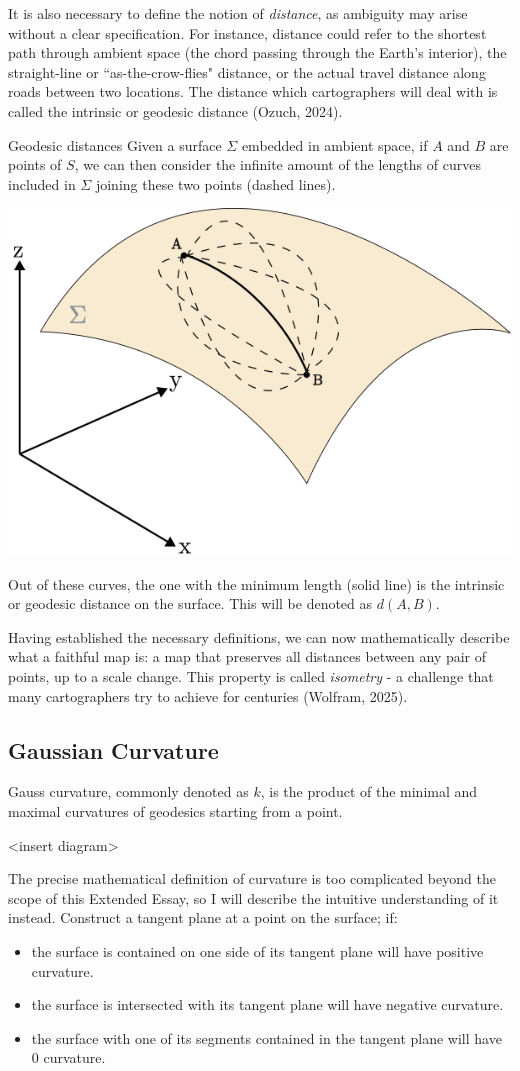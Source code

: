 It is also necessary to define the notion of \textit{distance}, as ambiguity may arise without a clear 
specification. For instance, distance could refer to the shortest path through ambient space (the chord 
passing through the Earth's interior), the straight-line or ``as-the-crow-flies" distance, or the actual travel 
distance along roads between two locations. The distance which cartographers will deal with is called the 
intrinsic or geodesic distance (Ozuch, 2024). 
\begin{definition}{Geodesic distances}
    Given a surface $\Sigma$ embedded in ambient space, if $A$ and $B$ are points of $S$, we can then consider 
    the infinite amount of the lengths of curves included in $\Sigma$ joining these two points (dashed lines). 
    \begin{center}
        \includegraphics[width=0.55\linewidth]
        {figures/distance.png}
    \end{center}
    Out of these curves, the one with the minimum length (solid line) is the intrinsic or geodesic distance on the surface. 
    This will be denoted as $d(A,B)$.
\end{definition}
Having established the necessary definitions, we can now mathematically describe what a faithful map is: a map that
preserves all distances between any pair of points, up to a scale change. This property is called \textit{isometry} 
- a challenge that many cartographers try to achieve for centuries (Wolfram, 2025). 

\pagebreak
\subsection{Gaussian Curvature}
\vspace*{-10pt}
Gauss curvature, commonly denoted as $k$, is the product of the minimal and maximal curvatures of geodesics starting from a point.

<insert diagram>

The precise mathematical definition of curvature is too complicated beyond the scope of this Extended Essay, so I will 
describe the intuitive understanding of it instead. Construct a tangent plane at a point on the surface; if:
\begin{itemize}
    \item the surface is contained on one side of its tangent plane will have positive curvature.
    \item the surface is intersected with its tangent plane will have negative curvature.
    \item the surface with one of its segments contained in the tangent plane will have 0 curvature. 
\end{itemize}

